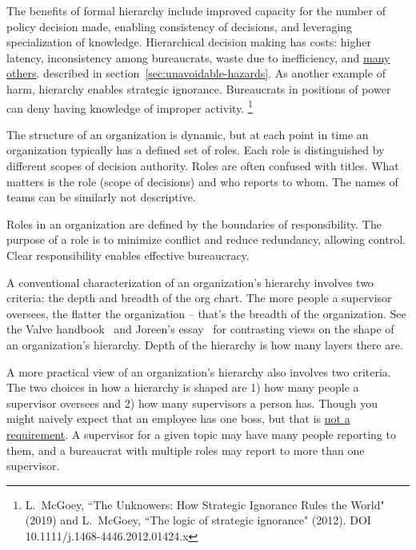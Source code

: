 The benefits of formal hierarchy include improved capacity for the number of policy decision made, enabling consistency of decisions, and leveraging specialization of knowledge. 
Hierarchical decision making has costs: higher latency, inconsistency among bureaucrats, waste due to inefficiency, and 
\hyperref[sec:unavoidable-hazards]{many others}.
\ifsectionref
described in section~\ref{sec:unavoidable-hazards}. 
\fi
As another example of harm, hierarchy enables strategic ignorance. Bureaucrats in positions of power can deny having knowledge of improper activity. 
\footnote{L.~McGoey, ``The Unknowers: How Strategic Ignorance Rules the World" (2019)
and 
L.~McGoey, ``The logic of strategic ignorance" (2012). DOI 
10.1111/j.1468-4446.2012.01424.x
}


The structure of an organization is dynamic, but at each point in time an organization typically has a defined set of roles. Each role is distinguished by different scopes of decision authority. 
Roles are often confused with titles. What matters is the role (scope of decisions) and who reports to whom. The names of teams can be similarly not descriptive.




Roles in an organization are defined by the boundaries of responsibility. The purpose of a role is to minimize conflict and reduce redundancy, allowing control. Clear responsibility enables effective bureaucracy. 


A conventional characterization of an organization's hierarchy involves two criteria: the depth and breadth of the org chart.
The more people a supervisor oversees, the flatter the organization -- that's the breadth of the organization. See the Valve handbook~\cite{2012_Valve} and Joreen's essay~\cite{1972_Joreen} for contrasting views on the shape of an organization's hierarchy. Depth of the hierarchy is how many layers there are.

A more practical view of an organization's hierarchy also involves two criteria. The two choices in how a hierarchy is shaped are 
1) how many people a supervisor oversees and 
2) how many supervisors a person has. 
Though you might naively expect that an employee has one boss, but that is \href{https://en.wikipedia.org/wiki/Matrix_management}{not a requirement}. A supervisor for a given topic may have many people reporting to them, and a bureaucrat with multiple roles may report to more than one supervisor.

